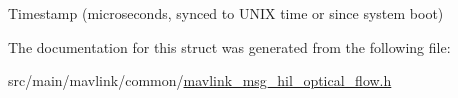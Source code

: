 Timestamp (microseconds, synced to U\+N\+I\+X time or since system boot) 



The documentation for this struct was generated from the following file\+:\begin{DoxyCompactItemize}
\item 
src/main/mavlink/common/\hyperlink{mavlink__msg__hil__optical__flow_8h}{mavlink\+\_\+msg\+\_\+hil\+\_\+optical\+\_\+flow.\+h}\end{DoxyCompactItemize}
